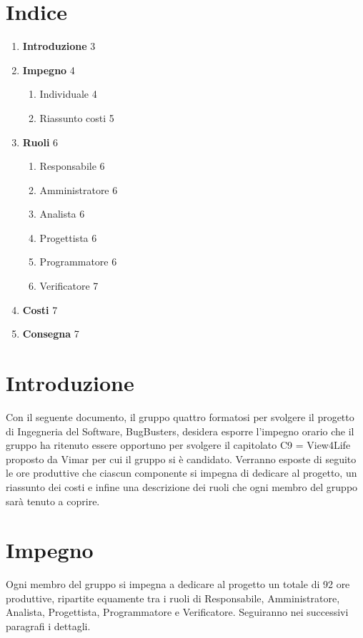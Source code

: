 \documentclass[a4paper,11pt]{article}
\begin{document}
\newpage

\section*{Indice}
\begin{enumerate}
\item \textbf{Introduzione} \hfill 3
\item \textbf{Impegno} \hfill 4
  \begin{enumerate}
  \item Individuale \hfill 4
  \item Riassunto costi \hfill 5
  \end{enumerate}
\item \textbf{Ruoli} \hfill 6
  \begin{enumerate}
  \item Responsabile \hfill 6
  \item Amministratore \hfill 6
  \item Analista \hfill 6
  \item Progettista \hfill 6
  \item Programmatore \hfill 6
  \item Verificatore \hfill 7
  \end{enumerate}
\item \textbf{Costi} \hfill 7
\item \textbf{Consegna} \hfill 7
\end{enumerate}

\newpage

\section{Introduzione}
Con il seguente documento, il gruppo quattro formatosi per svolgere il progetto di Ingegneria del Software, BugBusters, desidera esporre l'impegno orario che il gruppo ha ritenuto essere opportuno per svolgere il capitolato C9 = View4Life proposto da Vimar per cui il gruppo si è candidato. Verranno esposte di seguito le ore produttive che ciascun componente si impegna di dedicare al progetto, un riassunto dei costi e infine una descrizione dei ruoli che ogni membro del gruppo sarà tenuto a coprire.

\newpage

\section{Impegno}
Ogni membro del gruppo si impegna a dedicare al progetto un totale di 92 ore produttive, ripartite equamente tra i ruoli di Responsabile, Amministratore, Analista, Progettista, Programmatore e Verificatore. Seguiranno nei successivi paragrafi i dettagli.
\end{document}
